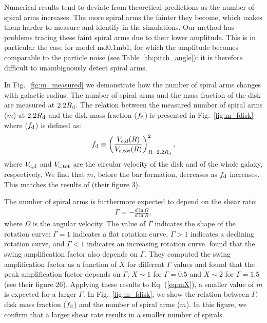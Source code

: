 Numerical results tend to deviate from theoretical predictions
as the number of spiral arms increases. The more spiral arms the 
fainter they become, which makes them harder to measure and identify
in the simulations. Our method has problems tracing these faint spiral arms
due to their lower amplitude. This is in particular the case for model md0.1mb1, for which
the amplitude becomes comparable to the particle noise 
(see Table~\ref{tb:pitch_angle}): it is therefore difficult to 
unambiguously detect spiral arms.

In Fig.~\ref{fig:m_measured} we demonstrate how the number of spiral arms
changes with galactic radius. The number of spiral arms and 
the mass fraction of the disk are measured at $2.2R_{\rm d}$.
The relation between the measured number of spiral arms ($m$) at $2.2R_{\rm d}$
and the disk mass fraction ($f_{\rm d}$) is presented in Fig.~\ref{fig:m_fdisk}
where  ($f_{\rm d}$) is defined as:
\begin{eqnarray}
  f_{\rm d}\equiv \left( \frac{V_{\rm c, d}(R)}{V_{\rm c, tot}(R)} \right)^2_{R=2.2R_{\rm d}},
\label{eq:fd} 
\end{eqnarray}
where $V_{\rm c, d}$ and $V_{\rm c, tot}$ are the circular velocity of the disk
and of the whole galaxy, respectively. We find that $m$, before the bar 
formation, decreases as $f_{\rm d}$ increases. This matches the results of 
\citet{2015ApJ...808L...8D} (their figure 3).




The number of spiral arms is furthermore expected to depend on the shear rate:
\begin{eqnarray}
\Gamma = -\frac{d\ln \Omega}{d \ln R},
\label{Eq:ShearRate}
\end{eqnarray}
where $\Omega$ is the angular velocity. The value of $\Gamma$ indicates the 
shape of the rotation curve: $\Gamma=1$ indicates a flat rotation curve, $\Gamma>1$ indicates
a declining rotation curve, and $\Gamma<1$ indicates an increasing rotation curve.
\citet{1984PhR...114..319A} found that the swing amplification factor also depends on 
$\Gamma$. They computed the swing amplification factor as a function of $X$
for different $\Gamma$ values and found that the peak amplification factor
depends on $\Gamma$; $X\sim 1$ for $\Gamma = 0.5$ and $X\sim 2$ for $\Gamma=1.5$
(see their figure 26). 
Applying these results to Eq. (\ref{eq:mX}), a smaller value of $m$ is expected for 
a larger $\Gamma$.
In Fig.~\ref{fig:m_fdisk}, we show the relation between
$\Gamma$, disk mass fraction ($f_{\rm d}$) and the number of spiral arms ($m$). 
In this figure, we confirm that a larger shear rate 
results in a smaller number of spirals.


